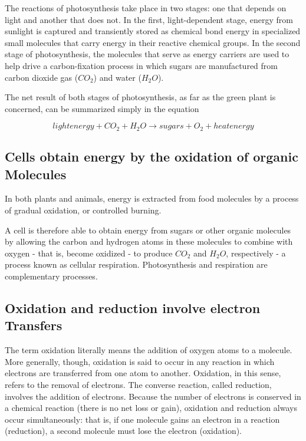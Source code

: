 The reactions of photosynthesis take place in two stages: one that
depends on light and another that does not. In the first, light-dependent
stage, energy from sunlight is captured and transiently stored
as chemical bond energy in specialized small molecules that carry energy
in their reactive chemical groups.
In the second stage of photosynthesis, the molecules that serve as energy
carriers are used to help drive a carbon-fixation process in which sugars
are manufactured from carbon dioxide gas ($CO_{2}$) and water ($H_{2}O$).

The net result of both stages of photosynthesis, as far as the green plant
is concerned, can be summarized simply in the equation

\begin{equation}
light energy + CO_{2} + H_{2}O \rightarrow sugars + O_{2} + heat energy
\end{equation}

\subsection{Cells obtain energy by the oxidation of organic Molecules}

In both plants and
animals, energy is extracted from food molecules by a process of gradual
oxidation, or controlled burning.

A cell is therefore able to obtain energy from sugars or other
organic molecules by allowing the carbon and hydrogen atoms in these
molecules to combine with oxygen - that is, become oxidized - to produce
$CO_{2}$ and $H_{2}O$, respectively - a process known as cellular respiration.
Photosynthesis and respiration are complementary processes.

\subsection{Oxidation and reduction involve electron Transfers}

The term oxidation literally means the addition of oxygen atoms to a
molecule. More generally, though, oxidation is said to occur in any
reaction in which electrons are transferred from one atom to another.
Oxidation, in this sense, refers to the removal of electrons. The converse
reaction, called reduction, involves the addition of electrons.
Because the
number of electrons is conserved in a chemical reaction (there is no net
loss or gain), oxidation and reduction always occur simultaneously: that
is, if one molecule gains an electron in a reaction (reduction), a second
molecule must lose the electron (oxidation).

